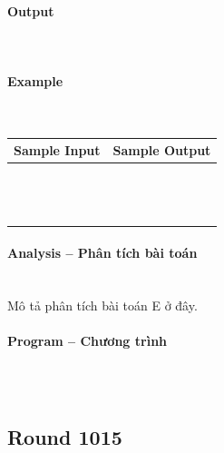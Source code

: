 \documentclass{article}
\begin{document}
\paragraph{Output}\mbox{} \\


\paragraph{Example}\mbox{} \\

\begin{table}[h]
    \centering
    \begin{tabular}{|l|r|}
        \hline
        \textbf{Sample Input} & \textbf{Sample Output} \\
        \hline
		&  \\ 
		&  \\ 
		&  \\ 
		&  \\ 
		&  \\
		&  \\ 
		&  \\ 
		&  \\ 
		&  \\ 
		&  \\ 
		&  \\ 
		&  \\
		&  \\ \hline
    \end{tabular}
\end{table}

\paragraph{Analysis -- Phân tích bài toán} \mbox{} \\

Mô tả phân tích bài toán E ở đây.

\paragraph{Program -- Chương trình} \mbox{} \\

\begin{lstlisting} 

\end{lstlisting}

\subsection{Round 1015}
\end{document}
